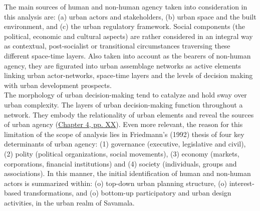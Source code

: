 \documentclass[11pt]{report}
\begin{document}
The main sources of human and non-human agency taken into consideration in this analysis are: (a) urban actors and stakeholders, (b) urban space and the built environment, and (c) the urban regulatory framework. Social components (the political, economic and cultural aspects) are rather considered in an integral way as contextual, post-socialist or transitional circumstances traversing these different space-time layers. Also taken into account as the bearers of non-human agency, they are figurated into urban assemblage networks as active elements linking urban actor-networks, space-time layers and the levels of decision making with urban development prospects.
\\

The morphology of urban decision-making tend to catalyze and hold sway over urban complexity. The layers of urban decision-making function throughout a network. They embody the relationality of urban elements and reveal the sources of urban agency (\href{ref}{Chapter 4, pp. XX}).
Even more relevant, the reason for this limitation of the scope of analysis lies in Friedmann's (1992) thesis of four key determinants of urban agency:
(1) governance (executive, legislative and civil),
(2) polity (political organizations, social movements),
(3) economy (markets, corporations, financial institutions) and
(4) society (individuals, groups and associations).
In this manner, the initial identification of human and non-human actors is summarized within:
(o) top-down urban planning structure,
(o) interest-based transformations,
and
(o) bottom-up participatory and urban design activities, in the urban realm of Savamala.
\end{document}
